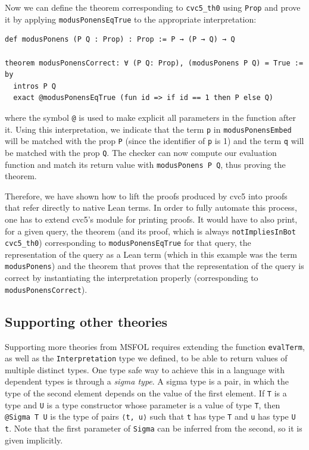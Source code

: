 Now we can define the theorem corresponding to \texttt{cvc5\_th0} using
\texttt{Prop} and prove it by applying \texttt{modusPonensEqTrue} to
the appropriate interpretation:

\begin{verbatim}
def modusPonens (P Q : Prop) : Prop := P → (P → Q) → Q

theorem modusPonensCorrect: ∀ (P Q: Prop), (modusPonens P Q) = True := by
  intros P Q
  exact @modusPonensEqTrue (fun id => if id == 1 then P else Q)
\end{verbatim}
where the symbol \texttt{@} is used to make explicit all parameters
in the function after it. Using this interpretation, we indicate
that the term \texttt{p} in \texttt{modusPonensEmbed}
will be matched with the prop \texttt{P} (since the identifier of \texttt{p}
is 1) and the term \texttt{q} will be matched with the prop \texttt{Q}.
The checker can now compute our evaluation function and
match its return value with \texttt{modusPonens P Q}, thus proving the theorem.

Therefore, we have shown how to lift the proofs produced by cvc5 into proofs
that refer directly to native Lean terms. In order to fully automate this
process, one has to extend cvc5's module for printing proofs. It would
have to also print, for a given query, the theorem (and its proof, which is always
\texttt{notImpliesInBot cvc5\_th0}) corresponding to \texttt{modusPonensEqTrue} for that query,
the representation of the query as a Lean term (which in this example was the term \texttt{modusPonens})
and the theorem that proves that the representation of the query is correct by instantiating the interpretation
properly (corresponding to \texttt{modusPonensCorrect}).

\subsection{Supporting other theories}

Supporting more theories from MSFOL requires extending the function \texttt{evalTerm},
as well as the \texttt{Interpretation} type we defined, to be able to return values
of multiple distinct types. One type safe way to achieve this in a language with
dependent types is through a \textit{sigma type}. A sigma type is a pair, in which
the type of the second element depends on the value of the first element. If
\texttt{T} is a type and \texttt{U} is a type constructor whose parameter
is a value of type \texttt{T},
then \texttt{@Sigma T U} is the type
of pairs \texttt{⟨t, u⟩} such that \texttt{t} has type \texttt{T} and
\texttt{u} has type \texttt{U t}. Note that the first parameter of \texttt{Sigma}
can be inferred from the second, so it is given implicitly.


